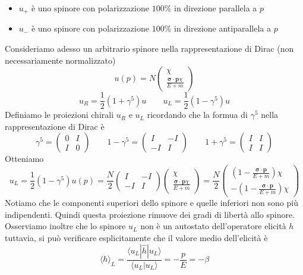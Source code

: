 \begin{itemize}
	\item $u_+$ è uno spinore con polarizzazione $100\%$ in direzione parallela a $p$
	\item $u_-$ è uno spinore con polarizzazione $100\%$ in direzione antiparallela a $p$
\end{itemize}
Consideriamo adesso un arbitrario spinore nella rappresentazione di Dirac (non necessariamente normalizzato)
$$
u(p) = N \begin{pmatrix} \chi \\ \frac{\boldsymbol{\sigma} \cdot \mathbf{p} \chi}{E + m} \end{pmatrix}
$$
$$
u_R = \frac{1}{2}(1 + \gamma^5) u \qquad u_L = \frac{1}{2}(1 - \gamma^5) u
$$
Definiamo le proiezioni chirali $u_R$ e $u_L$ ricordando che la formua di $\gamma^5$ nella rappresentazione di Dirac è
$$
\gamma^5 = \begin{pmatrix} 0 & I \\ I & 0 \end{pmatrix} \qquad 1 - \gamma^5 = \begin{pmatrix} I & -I \\ -I & I \end{pmatrix} \qquad 1 + \gamma^5 = \begin{pmatrix} I & I \\ I & I \end{pmatrix}
$$
Otteniamo
$$
u_L = \frac{1}{2}(1 - \gamma^5) u(p) = \frac{N}{2} \begin{pmatrix} I & -I \\ -I & I \end{pmatrix} \begin{pmatrix} \chi \\ \frac{\boldsymbol{\sigma} \cdot \mathbf{p} \chi}{E + m} \end{pmatrix} = \frac{N}{2} \begin{pmatrix} \left(1 - \frac{\boldsymbol{\sigma} \cdot \mathbf{p}}{E + m}\right) \chi \\ -\left(1 - \frac{\boldsymbol{\sigma} \cdot \mathbf{p}}{E + m}\right) \chi \end{pmatrix}
$$
Notiamo che le componenti superiori dello spinore e quelle inferiori non sono più indipendenti. Quindi questa proiezione rimuove dei gradi di libertà allo spinore. Osserviamo inoltre che lo spinore $u_L$ non è un autostato dell'operatore elicità $h$ tuttavia, si può verificare esplicitamente che il valore medio dell'elicità è
$$
\langle h \rangle_L = \frac{\langle u_L | \hat{h} | u_L \rangle}{\langle u_L | u_L \rangle} = - \frac{p}{E} = -\beta
$$
